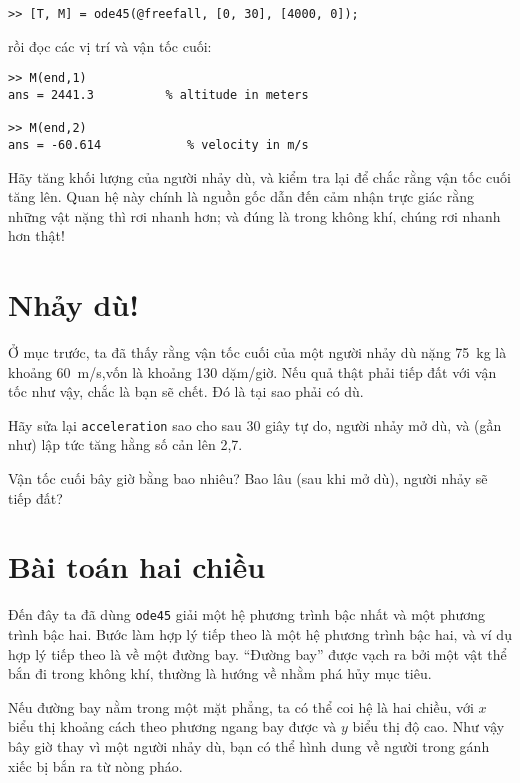 \documentclass[12pt]{book}
\begin{document}
\begin{verbatim}
>> [T, M] = ode45(@freefall, [0, 30], [4000, 0]);
\end{verbatim}
%
rồi đọc các vị trí và vận tốc cuối:

\begin{verbatim}
>> M(end,1)
ans = 2441.3          % altitude in meters

>> M(end,2)
ans = -60.614            % velocity in m/s
\end{verbatim}
%
\begin{ex}
Hãy tăng khối lượng của người nhảy dù, và kiểm tra lại để chắc
rằng vận tốc cuối tăng lên. Quan hệ này chính là nguồn gốc dẫn đến
cảm nhận trực giác rằng những vật nặng thì rơi nhanh hơn; và
đúng là trong không khí, chúng rơi nhanh hơn thật!
\end{ex}


\section{Nhảy dù!}

Ở mục trước, ta đã thấy rằng vận tốc cuối của một người nhảy dù
nặng 75~kg là khoảng 60~m/s,vốn là khoảng 130 dặm/giờ. Nếu 
quả thật phải tiếp đất với vận tốc như vậy, chắc là bạn sẽ chết. 
Đó là tại sao phải có dù.

\begin{ex}
Hãy sửa lại {\tt acceleration} sao cho sau 30 giây tự do, người nhảy
mở dù, và (gần như) lập tức tăng hằng số cản lên 2,7.

Vận tốc cuối bây giờ bằng bao nhiêu? Bao lâu (sau khi mở dù), người
nhảy sẽ tiếp đất?
\end{ex}


\section{Bài toán hai chiều}
\label{projectile}

Đến đây ta đã dùng {\tt ode45} giải một hệ phương trình bậc nhất
và một phương trình bậc hai. Bước làm hợp lý tiếp theo là một 
hệ phương trình bậc hai, và ví dụ hợp lý tiếp theo là về một đường bay.
``Đường bay'' được vạch ra bởi một vật thể bắn đi trong không khí,
thường là hướng về nhằm phá hủy mục tiêu.

Nếu đường bay nằm trong một mặt phẳng, ta có thể coi hệ là
hai chiều, với $x$ biểu thị khoảng cách theo phương ngang bay được
và $y$ biểu thị độ cao. Như vậy bây giờ thay vì một người nhảy dù,
bạn có thể hình dung về người trong gánh xiếc bị bắn ra từ nòng pháo.
\end{document}
